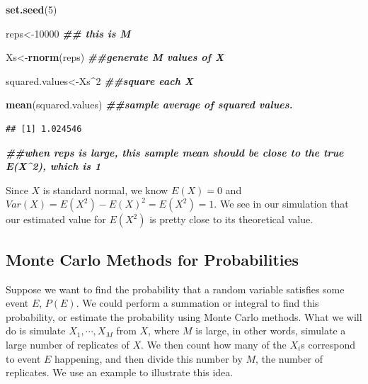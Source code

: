 \documentclass[
]{book}
\newenvironment{Shaded}{\begin{snugshade}}{\end{snugshade}}
\newcommand{\DecValTok}[1]{\textcolor[rgb]{0.00,0.00,0.81}{#1}}
\newcommand{\DocumentationTok}[1]{\textcolor[rgb]{0.56,0.35,0.01}{\textbf{\textit{#1}}}}
\newcommand{\FunctionTok}[1]{\textcolor[rgb]{0.13,0.29,0.53}{\textbf{#1}}}
\newcommand{\NormalTok}[1]{#1}
\newcommand{\OtherTok}[1]{\textcolor[rgb]{0.56,0.35,0.01}{#1}}
\newcommand{\SpecialCharTok}[1]{\textcolor[rgb]{0.81,0.36,0.00}{\textbf{#1}}}
\begin{document}
\begin{Shaded}
\begin{Highlighting}[]
\FunctionTok{set.seed}\NormalTok{(}\DecValTok{5}\NormalTok{)}

\NormalTok{reps}\OtherTok{\textless{}{-}}\DecValTok{10000} \DocumentationTok{\#\# this is M}

\NormalTok{Xs}\OtherTok{\textless{}{-}}\FunctionTok{rnorm}\NormalTok{(reps) }\DocumentationTok{\#\#generate M values of X}

\NormalTok{squared.values}\OtherTok{\textless{}{-}}\NormalTok{Xs}\SpecialCharTok{\^{}}\DecValTok{2} \DocumentationTok{\#\#square each X}

\FunctionTok{mean}\NormalTok{(squared.values) }\DocumentationTok{\#\#sample average of squared values. }
\end{Highlighting}
\end{Shaded}

\begin{verbatim}
## [1] 1.024546
\end{verbatim}

\begin{Shaded}
\begin{Highlighting}[]
\DocumentationTok{\#\#when reps is large, this sample mean should be close to the true E(X\^{}2), which is 1}
\end{Highlighting}
\end{Shaded}

Since \(X\) is standard normal, we know \(E(X) = 0\) and \(Var(X) = E(X^2) - E(X)^2 = E(X^2) = 1\). We see in our simulation that our estimated value for \(E(X^2)\) is pretty close to its theoretical value.

\subsection{Monte Carlo Methods for Probabilities}\label{monte-carlo-methods-for-probabilities}

Suppose we want to find the probability that a random variable satisfies some event \(E\), \(P(E)\). We could perform a summation or integral to find this probability, or estimate the probability using Monte Carlo methods. What we will do is simulate \(X_1, \cdots, X_M\) from \(X\), where \(M\) is large, in other words, simulate a large number of replicates of \(X\). We then count how many of the \(X_i\)s correspond to event \(E\) happening, and then divide this number by \(M\), the number of replicates. We use an example to illustrate this idea.
\end{document}
